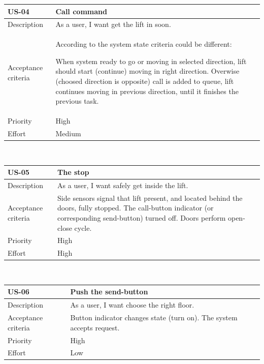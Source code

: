 \documentclass[a4paper,11pt]{article}
\begin{document}
\noindent\begin{tabularx}{\textwidth}{|C{2cm}|Y|}
  \hline
  \textbf{US-04} & \textbf{Call command}\\
  \hline
  Description &
  As a user, I want get the lift in soon.
  \\
  \hline
  Acceptance criteria &
  According to the system state criteria could be different:

  When system ready to go or moving in selected direction, lift should start (continue) moving in right direction. Overwise (choosed direction is opposite) call is added to queue, lift continues moving in previous direction, until it finishes the previous task.
  \\
  \hline
  Priority & High\\
  \hline
  Effort & Medium\\
  \hline
\end{tabularx}\\[15pt]

\noindent\begin{tabularx}{\textwidth}{|C{2cm}|Y|}
  \hline
  \textbf{US-05} & \textbf{The stop}\\
  \hline
  Description &
  As a user, I want safely get inside the lift.
  \\
  \hline
  Acceptance criteria &
  Side sensors signal that lift present, and located behind the doors, fully stopped. The call-button indicator (or corresponding send-button) turned off. Doors perform open-close cycle.
  \\
  \hline
  Priority & High\\
  \hline
  Effort & High\\
  \hline
\end{tabularx}\\[15pt]

\noindent\begin{tabularx}{\textwidth}{|C{2cm}|Y|}
  \hline
  \textbf{US-06} & \textbf{Push the send-button}\\
  \hline
  Description &
  As a user, I want choose the right floor.\\
  \hline
  Acceptance criteria &
  Button indicator changes state (turn on). The system accepts request.
  \\
  \hline
  Priority & High\\
  \hline
  Effort & Low\\
  \hline
\end{tabularx}\\[15pt]
\end{document}
